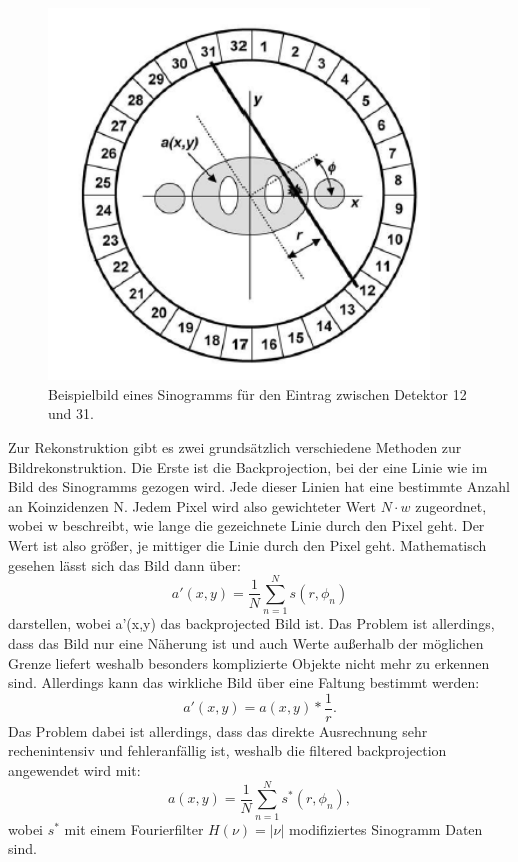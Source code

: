 \begin{figure}[h!]
	\centering
	\includegraphics[width=0.9\textwidth]{Sino.png}
	\caption{Beispielbild eines Sinogramms für den Eintrag zwischen Detektor 12 und 31.}
	\label{Sino}
\end{figure}

Zur Rekonstruktion gibt es zwei grundsätzlich verschiedene Methoden zur Bildrekonstruktion. Die Erste ist die Backprojection, bei der eine Linie wie im Bild des Sinogramms gezogen wird. Jede dieser Linien hat eine bestimmte Anzahl an Koinzidenzen N. Jedem Pixel wird also gewichteter Wert $N \cdot w$ zugeordnet, wobei w beschreibt, wie lange die gezeichnete Linie durch den Pixel geht. Der Wert ist also größer, je mittiger die Linie durch den Pixel geht. Mathematisch gesehen lässt sich das Bild dann über:
\begin{equation}
	a'(x,y) = \frac{1}{N} \sum_{n = 1}^{N}s(r,\phi_{n})
\end{equation}
darstellen, wobei a'(x,y) das backprojected Bild ist. Das Problem ist allerdings, dass das Bild nur eine Näherung ist und auch Werte außerhalb der möglichen Grenze liefert weshalb besonders komplizierte Objekte nicht mehr zu erkennen sind. Allerdings kann das wirkliche Bild über eine Faltung bestimmt werden:
\begin{equation}
	a'(x,y) = a(x,y)  * \frac{1}{r}.
\end{equation}
Das Problem dabei ist allerdings, dass das direkte Ausrechnung sehr rechenintensiv und fehleranfällig ist, weshalb die filtered backprojection angewendet wird mit:
\begin{equation}
	a(x,y) = \frac{1}{N} \sum_{n = 1}^{N} s^{*}(r,\phi_{n}),
\end{equation}
wobei $s^{*}$ mit einem Fourierfilter $H(\nu) = |\nu|$ modifiziertes Sinogramm Daten sind.

